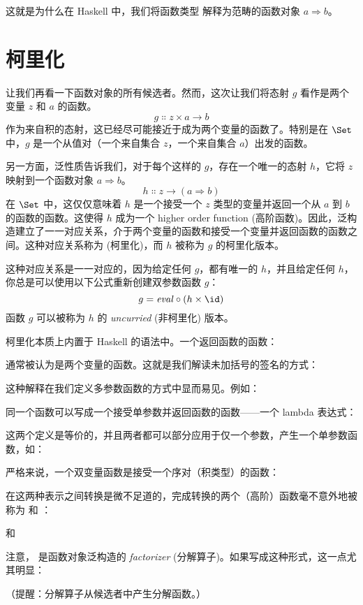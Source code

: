 这就是为什么在 Haskell 中，我们将函数类型  解释为范畴的函数对象 $a \Rightarrow b$。

\section{柯里化}

让我们再看一下函数对象的所有候选者。然而，这次让我们将态射 $g$ 看作是两个变量 $z$ 和 $a$ 的函数。
\[g \Colon z \times a \to b\]
作为来自积的态射，这已经尽可能接近于成为两个变量的函数了。特别是在 $\Set$ 中，$g$ 是一个从值对（一个来自集合 $z$，一个来自集合 $a$）出发的函数。

另一方面，泛性质告诉我们，对于每个这样的 $g$，存在一个唯一的态射 $h$，它将 $z$ 映射到一个函数对象 $a \Rightarrow b$。
\[h \Colon z \to (a \Rightarrow b)\]
在 $\Set$ 中，这仅仅意味着 $h$ 是一个接受一个 $z$ 类型的变量并返回一个从 $a$ 到 $b$ 的函数的函数。这使得 $h$ 成为一个 higher order function (高阶函数)。因此，泛构造建立了一一对应关系，介于两个变量的函数和接受一个变量并返回函数的函数之间。这种对应关系称为  (柯里化)，而 $h$ 被称为 $g$ 的柯里化版本。

这种对应关系是一一对应的，因为给定任何 $g$，都有唯一的 $h$，并且给定任何 $h$，你总是可以使用以下公式重新创建双参数函数 $g$：
\[g = \mathit{eval} \circ (h \times \id)\]
函数 $g$ 可以被称为 $h$ 的 \emph{uncurried} (非柯里化) 版本。

柯里化本质上内置于 Haskell 的语法中。一个返回函数的函数：

通常被认为是两个变量的函数。这就是我们解读未加括号的签名的方式：

这种解释在我们定义多参数函数的方式中显而易见。例如：

同一个函数可以写成一个接受单参数并返回函数的函数——一个 lambda 表达式：

这两个定义是等价的，并且两者都可以部分应用于仅一个参数，产生一个单参数函数，如：

严格来说，一个双变量函数是接受一个序对（积类型）的函数：

在这两种表示之间转换是微不足道的，完成转换的两个（高阶）函数毫不意外地被称为  和 ：

和

注意， 是函数对象泛构造的 \emph{factorizer} (分解算子)。如果写成这种形式，这一点尤其明显：

（提醒：分解算子从候选者中产生分解函数。）

